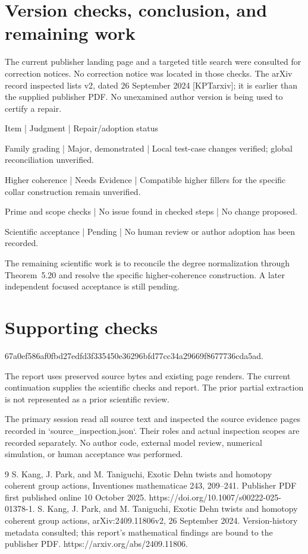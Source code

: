 \documentclass[10pt]{article}
\begin{document}
\section*{Version checks, conclusion, and remaining work}
The current publisher landing page and a targeted title search were consulted for correction notices. No correction notice was located in those checks. The arXiv record inspected lists v2, dated 26 September 2024 [KPTarxiv]; it is earlier than the supplied publisher PDF. No unexamined author version is being used to certify a repair.\par
Item | Judgment | Repair/adoption status\par
Family grading | Major, demonstrated | Local test-case changes verified; global reconciliation unverified.\par
Higher coherence | Needs Evidence | Compatible higher fillers for the specific collar construction remain unverified.\par
Prime and scope checks | No issue found in checked steps | No change proposed.\par
Scientific acceptance | Pending | No human review or author adoption has been recorded.\par
The remaining scientific work is to reconcile the degree normalization through Theorem 5.20 and resolve the specific higher-coherence construction. A later independent focused acceptance is still pending.\par
\section*{Supporting checks}
67a0ef586af0fbd27edfd3f335450e36296bfd77cc34a29669f8677736cda5ad.\par
The report uses preserved source bytes and existing page renders. The current continuation supplies the scientific checks and report. The prior partial extraction is not represented as a prior scientific review.\par
The primary session read all source text and inspected the source evidence pages recorded in `source\_inspection.json`. Their roles and actual inspection scopes are recorded separately. No author code, external model review, numerical simulation, or human acceptance was performed.\par
9 S. Kang, J. Park, and M. Taniguchi, Exotic Dehn twists and homotopy coherent group actions, Inventiones mathematicae 243, 209–241. Publisher PDF first published online 10 October 2025. https://doi.org/10.1007/s00222-025-01378-1. S. Kang, J. Park, and M. Taniguchi, Exotic Dehn twists and homotopy coherent group actions, arXiv:2409.11806v2, 26 September 2024. Version-history metadata consulted; this report’s mathematical findings are bound to the publisher PDF. https://arxiv.org/abs/2409.11806.\par
\end{document}
